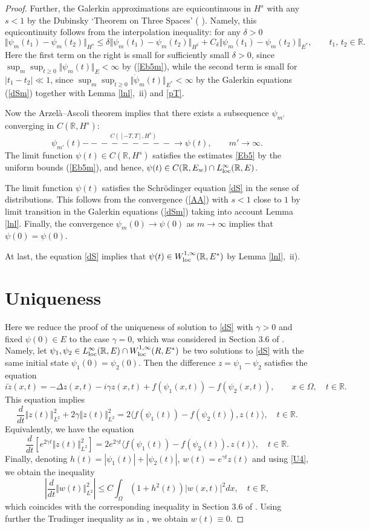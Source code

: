 \documentclass[11pt]{article}
\newcommand{\fr}{\frac}
\newcommand{\R}{{\mathbb R}}
\newcommand{\st}{\stackrel}
\newcommand{\toCHs}{\st{C([-T,T],H^s)}{-\!\!\!-\!\!\!-\!\!\!-\!\!\!-\!\!\!-\!\!\!-\!\!\!-\!\!\!-\!\!\!\to}}
\newcommand{\De}{\Delta}
\newcommand{\de}{\delta}
\newcommand{\ga}{\gamma}
\newcommand{\Om}{\Omega}
\newcommand{\loc}{{\rm loc}}
\newcommand{\5}{{\hspace{0.5mm}}}
\numberwithin{equation}{section}
\newcommand{\ci}{\cite}
\newcommand{\la}{\label}
\newcommand{\be}{\begin{equation}}
\newcommand{\ee}{\end{equation}}
\numberwithin{equation}{section}
\begin{document}
\begin{proof}
Further, the Galerkin approximations are equicontinuous in $H^s$ with any $s<1$ by the Dubinsky `Theorem on Three Spaces' ( \ci[Theorem 5.1]{L1969}).
Namely, this equicontinuity follows from the 
interpolation inequality: for any $\de>0$
\be\la{intin}
\Vert\psi_m(t_1)-\psi_m(t_2)\Vert_{H^s}\le \de \Vert\psi_m(t_1)-\psi_m(t_2)\Vert_{H^1}+C_\de
\Vert\psi_m(t_1)-\psi_m(t_2)\Vert_{E^*},\qquad t_1,\,t_2\in\R.
\ee
Here the first term on the right is small for sufficiently small $\de>0$, 
since $\sup_m \sup_{t\ge 0}\Vert\psi_m(t)\Vert_E<\infty$ by (\ref{Eb5m}),
while the second term is small for $|t_1-t_2|\ll 1$, 
since $\sup_m \sup_{t\ge 0}\Vert\dot \psi_m(t)\Vert_{E^*}<\infty$ by the Galerkin equations (\ref{dSm}) together with Lemma \ref{lnl},~ii) and \eqref{pT}.

Now the Arzel\`a--Ascoli theorem implies that there exists a subsequence $\psi_{m'}$
converging in $C(\R,H^s)$:
\be\la{AA}
\psi_{m'}(t) \toCHs\psi(t),\qquad m'\to\infty.
\ee
The limit function $\psi(t)\in C(\R,H^s)$ satisfies the
 estimates \eqref{Eb5} by the uniform bounds (\ref{Eb5m}),
 and hence, $\psi(t)\in C(\R,E_w)\cap L^\infty_\loc (\R,E)$.

The limit function $\psi(t)$ satisfies the Schr\"odinger equation \eqref{dS} in the sense of distributions.
This follows from the convergence (\ref{AA}) with $s<1$ close to $1$ by limit transition in the Galerkin equations (\ref{dSm})
taking into account Lemma \ref{lnl}.
Finally, the convergence $\psi_m(0)\to \psi(0)$ as $m\to\infty$ implies that $\psi(0)=\psi(0)$.

At last, the equation \eqref{dS} implies that $\psi(t)\in W^{1,\infty}_\loc(\R,E^*)$ by Lemma \ref{lnl},~ii).




\section{Uniqueness}\la{B}

Here we reduce the proof of the uniqueness of solution to \eqref{dS}
with $\ga>0$ and fixed $\psi(0)\in E$
to the case $\ga=0$, which was considered in Section 3.6 of \ci{C2003}.
Namely, let $\psi_1,\psi_2\in L^\infty_\loc(\R,E)\cap W^{1,\infty}_\loc(R, E^*)$
be two solutions to \eqref{dS}
with the same initial state $\psi_1(0)=\psi_2(0)$.
Then the difference $z=\psi_1-\psi_2$ satisfies the equation
$$
i\dot z(x,t)=-\De z(x,t)-i\ga z(x,t)+f(\psi_1(x,t))-f(\psi_2(x,t)),\qquad x\in\Om,\quad t\in\R.
$$
This equation implies
\be\la{dSa2}
\fr {d}{dt}\Vert z(t)\Vert_{L^2}^2+2\ga \Vert z(t)\Vert_{L^2}^2 =
2\langle f(\psi_1(t))-f(\psi_2(t)),z(t)\rangle,\quad t\in\R.
\ee
Equivalently, we have the equation
\be\la{dSa3}
\fr {d}{dt}[e^{2\ga t}\Vert z(t)\Vert_{L^2}^2] =2e^{2\ga t} \langle f(\psi_1(t))-f(\psi_2(t)),z(t)\rangle,\quad t\in\R.
\ee
Finally, denoting $h(t)=|\psi_1(t)|+|\psi_2(t)|$,
$w(t)=e^{\ga t}z(t)$ and using \eqref{U4}, we obtain the inequality
\be\la{dSa4}
|\fr {d}{dt}\Vert w(t)\Vert_{L^2}^2|\le
C\int_\Om (1+h^2(t)) | w(x,t)|^2dx,\quad t\in\R,
\ee
which
coincides with the corresponding inequality in Section 3.6 of \ci{C2003}.
Using further the Trudinger inequality as in \ci{C2003}, we obtain  $w(t)\equiv 0$.





\end{proof}
\end{document}
